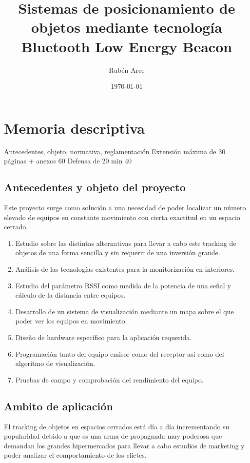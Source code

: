 \documentclass[a4paper ,12pt, onecolumn]{article}
\begin{document}
\title{Sistemas de posicionamiento de objetos mediante tecnología Bluetooth Low Energy
Beacon }
\author{Rubén Arce}
\date{\today}
\maketitle
\cleardoublepage
\tableofcontents
\cleardoublepage
\section{Memoria descriptiva}
Antecedentes, objeto, normativa, reglamentación
Extensión máxima de 30 páginas + anexos 60
Defensa de 20 min  40
    \subsection{Antecedentes y objeto del proyecto}
        Este proyecto surge como solución a una necesidad de poder localizar un número elevado de equipos en 
        constante movimiento con cierta exactitud en un espacio cerrado.
        \begin{enumerate}
            \item Estudio sobre las distintas alternativas para llevar a cabo este tracking de objetos de una forma
            sencilla y sin requerir de una inversión grande.
            \item Análisis de las tecnologías existentes para la monitorización en interiores.
            \item  Estudio del parámetro RSSI como medida de la potencia de una señal y cálculo de la distancia entre equipos.
            \item Desarrollo de un sistema de visualización mediante un mapa sobre el que poder ver los equipos en movimiento.
            \item Diseño de hardware específico para la aplicación requerida.
            \item Programación tanto del equipo emisor como del receptor así como del algoritmo de visualización.
            \item Pruebas de campo y comprobación del rendimiento del equipo.
        \end{enumerate}
    \subsection{Ambito de aplicación}
        El tracking de objetos en espacios cerrados está día a día incrementando su popularidad debido a que es una 
        arma de propaganda muy poderosa que demandan los grandes hipermercados para llevar a cabo estudios de marketing
        y poder analizar el comportamiento de los clietes.
\end{document}
